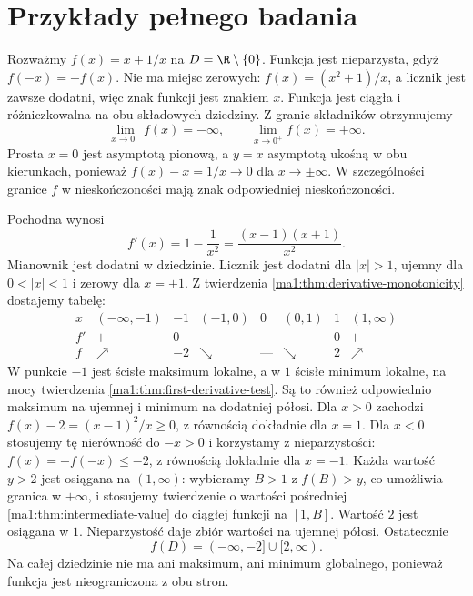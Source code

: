 \section{Przykłady pełnego badania}
\begin{przyklad}
\label{ma1:ex:variation-rational}
Rozważmy $f(x)=x+1/x$ na $D=\R\setminus\{0\}$. Funkcja jest nieparzysta, gdyż $f(-x)=-f(x)$. Nie ma miejsc zerowych: $f(x)=(x^2+1)/x$, a licznik jest zawsze dodatni, więc znak funkcji jest znakiem $x$. Funkcja jest ciągła i różniczkowalna na obu składowych dziedziny. Z granic składników otrzymujemy
\[
 \lim_{x\to0^-}f(x)=-\infty,\qquad
 \lim_{x\to0^+}f(x)=+\infty.
\]
Prosta $x=0$ jest asymptotą pionową, a $y=x$ asymptotą ukośną w obu kierunkach, ponieważ $f(x)-x=1/x\to0$ dla $x\to\pm\infty$. W szczególności granice $f$ w nieskończoności mają znak odpowiedniej nieskończoności.

Pochodna wynosi
\[
 f'(x)=1-\frac1{x^2}=\frac{(x-1)(x+1)}{x^2}.
\]
Mianownik jest dodatni w dziedzinie. Licznik jest dodatni dla $|x|>1$, ujemny dla $0<|x|<1$ i zerowy dla $x=\pm1$. Z twierdzenia \ref{ma1:thm:derivative-monotonicity} dostajemy tabelę:
\[
\begin{array}{c|ccccccc}
 x&(-\infty,-1)&-1&(-1,0)&0&(0,1)&1&(1,\infty)\\ \hline
 f'&+&0&-&\text{---}&-&0&+\\
 f&\nearrow&-2&\searrow&\text{---}&\searrow&2&\nearrow
\end{array}
\]
W punkcie $-1$ jest ścisłe maksimum lokalne, a w $1$ ścisłe minimum lokalne, na mocy twierdzenia \ref{ma1:thm:first-derivative-test}. Są to również odpowiednio maksimum na ujemnej i minimum na dodatniej półosi. Dla $x>0$ zachodzi $f(x)-2=(x-1)^2/x\ge0$, z równością dokładnie dla $x=1$. Dla $x<0$ stosujemy tę nierówność do $-x>0$ i korzystamy z nieparzystości: $f(x)=-f(-x)\le-2$, z równością dokładnie dla $x=-1$. Każda wartość $y>2$ jest osiągana na $(1,\infty)$: wybieramy $B>1$ z $f(B)>y$, co umożliwia granica w $+\infty$, i stosujemy twierdzenie o wartości pośredniej \ref{ma1:thm:intermediate-value} do ciągłej funkcji na $[1,B]$. Wartość $2$ jest osiągana w $1$. Nieparzystość daje zbiór wartości na ujemnej półosi. Ostatecznie
\[
 f(D)=(-\infty,-2]\cup[2,\infty).
\]
Na całej dziedzinie nie ma ani maksimum, ani minimum globalnego, ponieważ funkcja jest nieograniczona z obu stron.
\end{przyklad}
